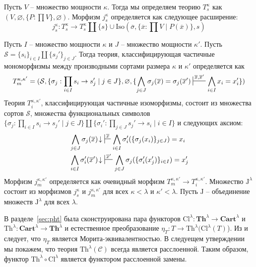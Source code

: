 \documentclass[reqno]{amsart}
\theoremstyle{definition}
\theoremstyle{remark}
\newcommand{\bcat}[1]{\mathbf{#1}}
\newcommand{\cat}[1]{\mathcal{#1}}
\newcommand{\fs}[1]{\mathrm{#1}}
\newcommand{\Th}{\bcat{Th}}
\newcommand{\J}{\mathrm{J}}
\begin{document}
Пусть $V$ -- множество мощности $\kappa$.
Тогда мы определяем теорию $T^\kappa_s$ как $(V, \varnothing, \{ P : \prod V \}, \varnothing)$.
Морфизм $j^\kappa_s$ определяется как следующее расширение:
\[ j^\kappa_s : T^\kappa_s \to T^\kappa_s \amalg \{ s \} \cup \fs{Iso}(\overline{\sigma}, \{ \overline{x} : \prod V \mid P(\overline{x}) \}, s) \]

Пусть $I$ -- множество мощности $\kappa$ и $J$ -- множество мощности $\kappa'$.
Пусть $\mathcal{S} = \{ s_i \}_{i \in I} \amalg \{ s_j' \}_{j \in J}$.
Тогда теория, классифицирующая частичные мономорфизмы между производными сортами размера $\kappa$ и $\kappa'$ определяется как
\[ T_m^{\kappa,\kappa'} = (\mathcal{S}, \{ \sigma_j : \prod_{i \in I} s_i \to s_j' \mid j \in J \}, \varnothing, \{ \bigwedge_{j \in J} \sigma_j(\overline{x}) = \sigma_j(\overline{x}') \sststile{}{\overline{x},\overline{x}'} \bigwedge_{i \in I} x_i = x_i' \}) \]
Теория $T_i^{\kappa,\kappa'}$, классифицирующая частичные изоморфизмы, состоит из множества сортов $\mathcal{S}$, множества функциональных символов $\{ \sigma_j : \prod_{i \in I} s_i \to s_j' \mid j \in J \} \amalg \{ \sigma_i' : \prod_{j \in J} s_j' \to s_i \mid i \in I \}$ и следующих аксиом:
\begin{align*}
& \bigwedge_{j \in J} \sigma_j(\overline{x})\!\downarrow\ \sststile{}{\overline{x}} \bigwedge_{i \in I} \sigma_i'(\{ \sigma_j(x_i) \}_{j \in J}) = x_i \\
& \bigwedge_{i \in I} \sigma_i'(\overline{x}')\!\downarrow\ \sststile{}{\overline{x}'} \bigwedge_{j \in J} \sigma_j(\{ \sigma_i'(x_j') \}_{i \in I}) = x_j'
\end{align*}
Морфизм $j_m^{\kappa,\kappa'}$ определяется как очевидный морфизм $T_m^{\kappa,\kappa'} \to T_i^{\kappa,\kappa'}$.
Множество $\J^\lambda$ состоит из морфизмов $j^\kappa_s$ и $j_m^{\kappa,\kappa'}$ для всех $\kappa < \lambda$ и $\kappa' < \lambda$.
Пусть $\J$ -- объединение множеств $\J^\lambda$ для всех $\lambda$.

В разделе~\ref{sec:pht} была сконструирована пара функторов $\fs{Cl}^\lambda : \Th^\lambda \to \bcat{Cart}^\lambda$ и $\fs{Th}^\lambda : \bcat{Cart}^\lambda \to \Th^\lambda$ и естественное преобразование $\eta_T : T \to \fs{Th}^\lambda(\fs{Cl}^\lambda(T)$).
Из  и  следует, что $\eta_T$ является Морита-эквивалентностью.
В следуещем утверждении мы покажем, что теория $\fs{Th}^\lambda(\cat{C})$ всегда является расслоенной.
Таким образом, функтор $\fs{Th}^\lambda \circ \fs{Cl}^\lambda$ является функтором расслоенной замены.
\end{document}
